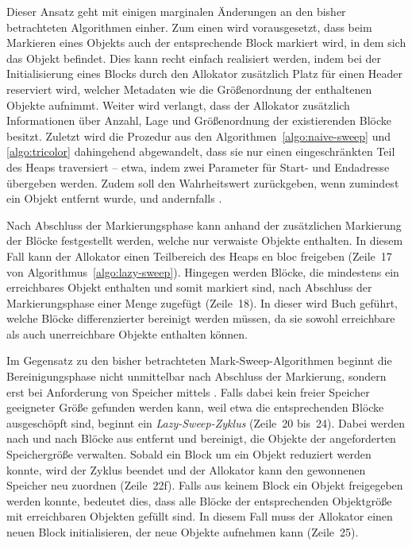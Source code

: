 Dieser Ansatz geht mit einigen marginalen Änderungen an den bisher betrachteten Algorithmen einher.
Zum einen wird vorausgesetzt, dass beim Markieren eines Objekts auch der entsprechende Block markiert wird, in dem sich das Objekt befindet.
Dies kann recht einfach realisiert werden, indem bei der Initialisierung eines Blocks durch den Allokator zusätzlich Platz für einen Header reserviert wird, welcher Metadaten wie die Größenordnung der enthaltenen Objekte aufnimmt.
Weiter wird verlangt, dass der Allokator zusätzlich Informationen über Anzahl, Lage und Größenordnung der existierenden Blöcke besitzt.
Zuletzt wird die Prozedur  aus den Algorithmen~\ref{algo:naive-sweep} und \ref{algo:tricolor} dahingehend abgewandelt, dass sie nur einen eingeschränkten Teil des Heaps traversiert -- etwa, indem zwei Parameter für Start- und Endadresse übergeben werden.
Zudem soll  den Wahrheitswert  zurückgeben, wenn zumindest ein Objekt entfernt wurde, und andernfalls .

Nach Abschluss der Markierungsphase kann anhand der zusätzlichen Markierung der Blöcke festgestellt werden, welche nur verwaiste Objekte enthalten.
In diesem Fall kann der Allokator einen Teilbereich des Heaps en bloc freigeben (Zeile~17 von Algorithmus~\ref{algo:lazy-sweep}).
Hingegen werden Blöcke, die mindestens ein erreichbares Objekt enthalten und somit markiert sind, nach Abschluss der Markierungsphase einer Menge  zugefügt (Zeile~18).
In dieser wird Buch geführt, welche Blöcke differenzierter bereinigt werden müssen, da sie sowohl erreichbare als auch unerreichbare Objekte enthalten können.

Im Gegensatz zu den bisher betrachteten Mark-Sweep-Algorithmen beginnt die Bereinigungsphase nicht unmittelbar nach Abschluss der Markierung, sondern erst bei Anforderung von Speicher mittels .
Falls dabei kein freier Speicher geeigneter Größe gefunden werden kann, weil etwa die entsprechenden Blöcke ausgeschöpft sind, beginnt ein \textit{Lazy-Sweep-Zyklus} (Zeile~20 bis~24).
Dabei werden nach und nach Blöcke aus  entfernt und bereinigt, die Objekte der angeforderten Speichergröße verwalten.
Sobald ein Block um ein Objekt reduziert werden konnte, wird der Zyklus beendet und der Allokator kann den gewonnenen Speicher neu zuordnen (Zeile~22f).
Falls aus keinem Block ein Objekt freigegeben werden konnte, bedeutet dies, dass alle Blöcke der entsprechenden Objektgröße mit erreichbaren Objekten gefüllt sind.
In diesem Fall muss der Allokator einen neuen Block initialisieren, der neue Objekte aufnehmen kann (Zeile~25).

